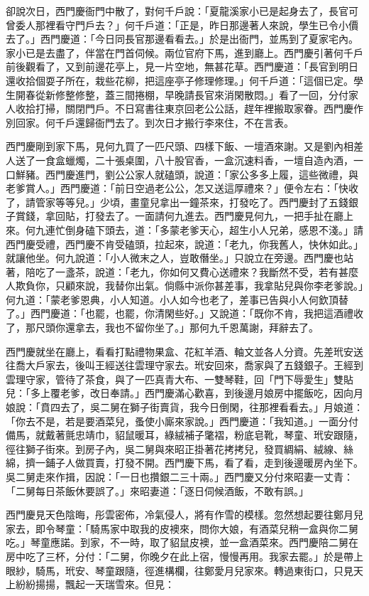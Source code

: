 \begin{showcontents}{}
卻說次日，西門慶衙門中散了，對何千戶說：「夏龍溪家小已是起身去了，長官可曾委人那裡看守門戶去？」何千戶道：「正是，昨日那邊著人來說，學生已令小價去了。」西門慶道：「今日同長官那邊看看去。」於是出衙門，並馬到了夏家宅內。家小已是去盡了，伴當在門首伺候。兩位官府下馬，進到廳上。西門慶引著何千戶前後觀看了，又到前邊花亭上，見一片空地，無甚花草。西門慶道：「長官到明日還收拾個耍子所在，栽些花柳，把這座亭子修理修理。」何千戶道：「這個已定。學生開春從新修整修整，蓋三間捲棚，早晚請長官來消閑散悶。」看了一回，分付家人收拾打掃，關閉門戶。不日寫書往東京回老公公話，趕年裡搬取家眷。西門慶作別回家。何千戶還歸衙門去了。到次日才搬行李來住，不在言表。

西門慶剛到家下馬，見何九買了一匹尺頭、四樣下飯、一壇酒來謝。又是劉內相差人送了一食盒蠟燭，二十張桌圍，八十股官香，一盒沉速料香，一壇自造內酒，一口鮮豬。西門慶進門，劉公公家人就磕頭，說道：「家公多多上履，這些微禮，與老爹賞人。」西門慶道：「前日空過老公公，怎又送這厚禮來？」便令左右：「快收了，請管家等等兒。」少頃，畫童兒拿出一鐘茶來，打發吃了。西門慶封了五錢銀子賞錢，拿回貼，打發去了。一面請何九進去。西門慶見何九，一把手扯在廳上來。何九連忙倒身磕下頭去，道：「多蒙老爹天心，超生小人兄弟，感恩不淺。」請西門慶受禮，西門慶不肯受磕頭，拉起來，說道：「老九，你我舊人，快休如此。」就讓他坐。何九說道：「小人微末之人，豈敢僭坐。」只說立在旁邊。西門慶也站著，陪吃了一盞茶，說道：「老九，你如何又費心送禮來？我斷然不受，若有甚麼人欺負你，只顧來說，我替你出氣。倘縣中派你甚差事，我拿貼兒與你李老爹說。」何九道：「蒙老爹恩典，小人知道。小人如今也老了，差事已告與小人何欽頂替了。」西門慶道：「也罷，也罷，你清閑些好。」又說道：「既你不肯，我把這酒禮收了，那尺頭你還拿去，我也不留你坐了。」那何九千恩萬謝，拜辭去了。

西門慶就坐在廳上，看看打點禮物果盒、花紅羊酒、軸文並各人分資。先差玳安送往喬大戶家去，後叫王經送往雲理守家去。玳安回來，喬家與了五錢銀子。王經到雲理守家，管待了茶食，與了一匹真青大布、一雙琴鞋，回「門下辱愛生」雙貼兒：「多上覆老爹，改日奉請。」西門慶滿心歡喜，到後邊月娘房中擺飯吃，因向月娘說：「賁四去了，吳二舅在獅子街賣貨，我今日倒閑，往那裡看看去。」月娘道：「你去不是，若是要酒菜兒，蚤使小廝來家說。」西門慶道：「我知道。」一面分付備馬，就戴著氈忠靖巾，貂鼠暖耳，綠絨補子氅褶，粉底皂靴，琴童、玳安跟隨，徑往獅子街來。到房子內，吳二舅與來昭正掛著花拷拷兒，發買綢絹、絨線、絲綿，擠一鋪子人做買賣，打發不開。西門慶下馬，看了看，走到後邊暖房內坐下。吳二舅走來作揖，因說：「一日也攢銀二三十兩。」西門慶又分付來昭妻一丈青：「二舅每日茶飯休要誤了。」來昭妻道：「逐日伺候酒飯，不敢有誤。」

西門慶見天色陰晦，彤雲密佈，冷氣侵人，將有作雪的模樣。忽然想起要往鄭月兒家去，即令琴童：「騎馬家中取我的皮襖來，問你大娘，有酒菜兒稍一盒與你二舅吃。」琴童應諾。到家，不一時，取了貂鼠皮襖，並一盒酒菜來。西門慶陪二舅在房中吃了三杯，分付：「二舅，你晚夕在此上宿，慢慢再用。我家去罷。」於是帶上眼紗，騎馬，玳安、琴童跟隨，徑進構欄，往鄭愛月兒家來。轉過東街口，只見天上紛紛揚揚，飄起一天瑞雪來。但見：


\end{showcontents}
